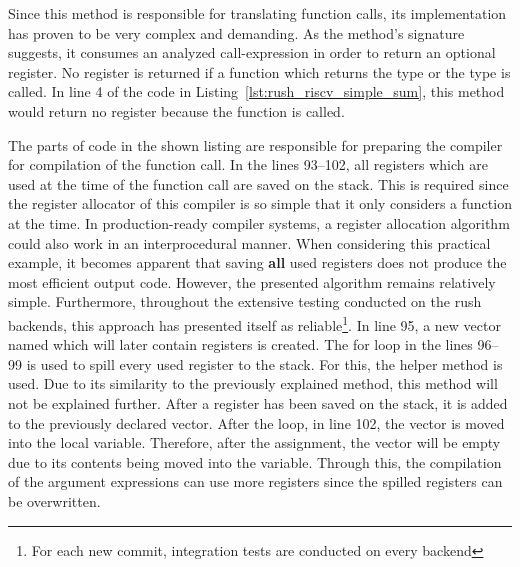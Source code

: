 
Since this method is responsible for translating function calls, its implementation has proven to be very complex and demanding.
As the method's signature suggests, it consumes an analyzed call-expression in order to return an optional register.
No register is returned if a function which returns the \qVerb{()} type or the \qVerb{!} type is called.
In line 4 of the code in Listing~\ref{lst:rush_riscv_simple_sum}, this method would return no register because the  function is called.

The parts of code in the shown listing are responsible for preparing the compiler for compilation of the function call.
In the lines 93--102, all registers which are used at the time of the function call are saved on the stack.
This is required since the register allocator of this compiler is so simple that it only considers a function at the time.
In production-ready compiler systems, a register allocation algorithm could also work in an interprocedural manner.
When considering this practical example, it becomes apparent that saving \textbf{all} used registers does not produce the most efficient output code.
However, the presented algorithm remains relatively simple.
Furthermore, throughout the extensive testing conducted on the rush backends, this approach has presented itself as reliable\footnote{For each new commit, \rushCountTests integration tests are conducted on every backend}.
In line 95, a new vector named  which will later contain registers is created.
The for loop in the lines 96--99 is used to spill every used register to the stack.
For this, the helper method  is used.
Due to its similarity to the previously explained  method, this method will not be explained further.
After a register has been saved on the stack, it is added to the previously declared vector.
After the loop, in line 102, the  vector is moved into the local  variable.
Therefore, after the assignment, the  vector will be empty due to its contents being moved into the  variable.
Through this, the compilation of the argument expressions can use more registers since the spilled registers can be overwritten.

